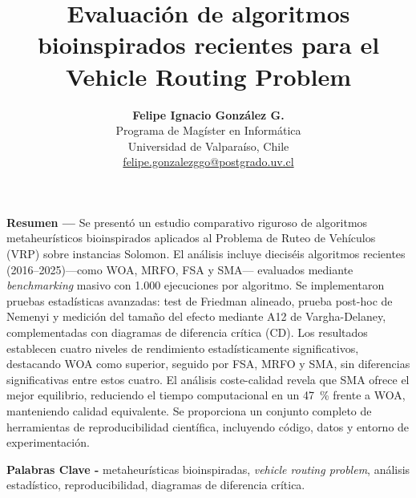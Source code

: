 \documentclass[10pt,a4paper]{extarticle}
\begin{document}
\title{Evaluación de algoritmos bioinspirados recientes para el Vehicle Routing Problem}
\author{%
  \begin{tabular}{c}
    \textbf{Felipe Ignacio González G.}\\
    Programa de Magíster en Informática\\
    Universidad de Valparaíso, Chile\\
    \href{mailto:felipe.gonzalezggo@postgrado.uv.cl}{felipe.gonzalezggo@postgrado.uv.cl}
  \end{tabular}}
\date{}
\maketitle

{\small
\noindent\textbf{Resumen ---} Se presentó un estudio comparativo riguroso de algoritmos metaheurísticos bioinspirados aplicados al Problema de Ruteo de Vehículos (VRP) sobre instancias Solomon. El análisis incluye dieciséis algoritmos recientes (2016--2025)—como WOA, MRFO, FSA y SMA— evaluados mediante \textit{benchmarking} masivo con 1.000 ejecuciones por algoritmo. Se implementaron pruebas estadísticas avanzadas: test de Friedman alineado, prueba post-hoc de Nemenyi y medición del tamaño del efecto mediante A12 de Vargha-Delaney, complementadas con diagramas de diferencia crítica (CD). Los resultados establecen cuatro niveles de rendimiento estadísticamente significativos, destacando WOA como superior, seguido por FSA, MRFO y SMA, sin diferencias significativas entre estos cuatro. El análisis coste-calidad revela que SMA ofrece el mejor equilibrio, reduciendo el tiempo computacional en un 47~\% frente a WOA, manteniendo calidad equivalente. Se proporciona un conjunto completo de herramientas de reproducibilidad científica, incluyendo código, datos y entorno de experimentación.

\noindent\textbf{Palabras Clave -} metaheurísticas bioinspiradas, \textit{vehicle routing problem}, análisis estadístico, reproducibilidad, diagramas de diferencia crítica.
}
\end{document}
